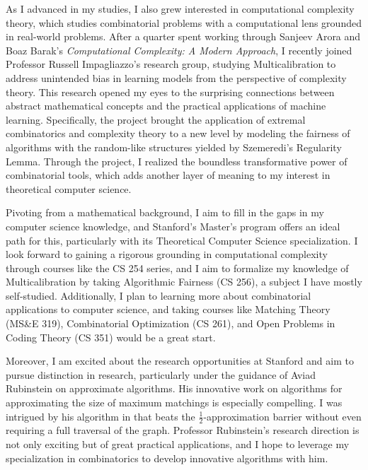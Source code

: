 \documentclass[12pt]{article}
\begin{document}
As I advanced in my studies, I also grew interested in computational complexity theory, which
studies combinatorial problems with a computational lens grounded in real-world problems. After a
quarter spent working through Sanjeev Arora and Boaz Barak's \textit{Computational Complexity: A
Modern Approach}\cite{arora2009computational}, I recently joined Professor Russell Impagliazzo's
research group, studying Multicalibration to address unintended bias in learning models from the
perspective of complexity theory. This research opened my eyes to the surprising connections between
abstract mathematical concepts and the practical applications of machine learning. Specifically, the
project brought the application of extremal combinatorics and complexity theory to a new level by
modeling the fairness of algorithms with the random-like structures yielded by Szemeredi's
Regularity Lemma. Through the project, I realized the boundless transformative power of
combinatorial tools, which adds another layer of meaning to my interest in theoretical computer
science.

Pivoting from a mathematical background, I aim to fill in the gaps in my computer science knowledge,
and Stanford's Master's program offers an ideal path for this, particularly with its Theoretical
Computer Science specialization. I look forward to gaining a rigorous grounding in computational
complexity through courses like the CS 254 series, and I aim to formalize my knowledge of
Multicalibration by taking Algorithmic Fairness (CS 256), a subject I have mostly self-studied.
Additionally, I plan to learning more about combinatorial applications to computer science, and
taking courses like Matching Theory (MS\&E 319), Combinatorial Optimization (CS 261), and Open
Problems in Coding Theory (CS 351) would be a great start.

Moreover, I am excited about the research opportunities at Stanford and aim to pursue distinction in
research, particularly under the guidance of Aviad Rubinstein on approximate algorithms. His
innovative work on algorithms for approximating the size of maximum matchings is especially
compelling. I was intrigued by his algorithm in \cite{doi:10.1137/1.9781611977554.ch151} that beats
the $\frac{1}{2}$-approximation barrier without even requiring a full traversal of the graph.
Professor Rubinstein's research direction is not only exciting but of great practical applications,
and I hope to leverage my specialization in combinatorics to develop innovative algorithms with him.
\end{document}
